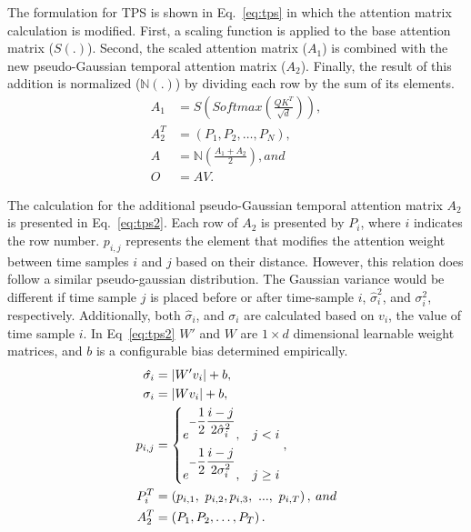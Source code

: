 \documentclass[journal]{IEEEtran}
\begin{document}
The formulation for TPS is shown in Eq.~\eqref{eq:tps} in which the attention matrix calculation is modified. First, a scaling function is applied to the base attention matrix ($S\left(.\right)$). Second, the scaled attention matrix ($A_1$) is combined with the new pseudo-Gaussian temporal attention matrix ($A_2$). Finally, the result of this addition is normalized ($\mathbb{N}\left(.\right)$) by dividing each row by the sum of its elements.
\begin{equation} \label{eq:tps}
\begin{split}
A_1&=S\left(Softmax\left(\frac{QK^T}{\sqrt d}\right)\right),\\
A_2^T&=\left(P_1,P_2,\ldots,P_N\right),\\
A&=\mathbb{N}\left(\frac{A_1+ A_2}{2}\right), and\\
O&=AV.
\end{split}
\end{equation}

The calculation for the additional pseudo-Gaussian temporal attention matrix $A_2$ is presented in Eq.~\eqref{eq:tps2}. Each row of $A_2$ is presented by $P_i$, where $i$ indicates the row number. $p_{i,j}$ represents the element that modifies the attention weight between time samples $i$ and $j$ based on their distance. However, this relation does follow a similar pseudo-gaussian distribution. The Gaussian variance would be different if time sample $j$ is placed before or after time-sample $i$, $\hat{\sigma}_i^{2}$, and $\sigma_i^2$, respectively. Additionally, both $\hat{\sigma}_i$, and $\sigma_i$ are calculated based on $v_i$, the value of time sample $i$. In Eq~\eqref{eq:tps2} $W'$ and $W$ are $1\times d$ dimensional learnable weight matrices, and $b$ is a configurable bias determined empirically. 
\begin{equation} \label{eq:tps2}
\begin{split}
\hat{\sigma_i}&=\left|W^\prime v_i\right|+b, \\
\sigma_i&=\left|Wv_i\right|+b,\\
p_{i,j}&=\begin{dcases}
e^{-\dfrac{1}{2}\dfrac{i-j}{2\hat{\sigma}^{2}_{i}} }, &j <i\\
e^{-\dfrac{1}{2}\dfrac{i-j}{2\sigma^{2}_{i}} }, &j\geq i\\
\end{dcases},\\
P_i^T&=\left(p_{i,1},\ p_{i,2},p_{i,3},\ ...,\ p_{i,T}\right),\: and\\
A_2^T&=\left(P_1,P_2,\ldots,P_T\right).\\
\end{split}
\end{equation}
\end{document}
